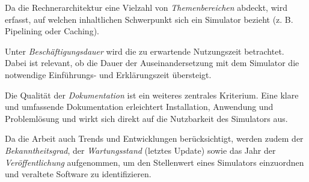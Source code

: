 Da die Rechnerarchitektur eine Vielzahl von \textit{Themenbereichen} abdeckt, wird erfasst, auf welchen inhaltlichen Schwerpunkt sich ein Simulator bezieht (z. B. Pipelining oder Caching).

Unter \textit{Beschäftigungsdauer} wird die zu erwartende Nutzungszeit betrachtet. Dabei ist relevant, ob die Dauer der Auseinandersetzung mit dem Simulator die notwendige Einführungs- und Erklärungszeit übersteigt.

Die Qualität der \textit{Dokumentation} ist ein weiteres zentrales Kriterium. Eine klare und umfassende Dokumentation erleichtert Installation, Anwendung und Problemlösung und wirkt sich direkt auf die Nutzbarkeit des Simulators aus.

Da die Arbeit auch Trends und Entwicklungen berücksichtigt, werden zudem der \textit{Bekanntheitsgrad}, der \textit{Wartungsstand} (letztes Update) sowie das Jahr der \textit{Veröffentlichung} aufgenommen, um den Stellenwert eines Simulators einzuordnen und veraltete Software zu identifizieren.

